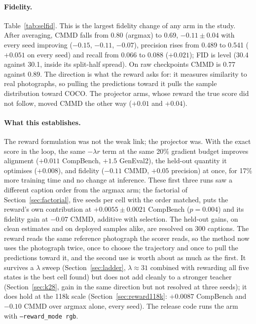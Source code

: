 \documentclass[11pt,a4paper]{article}
\begin{document}
\paragraph{Fidelity.}
Table~\ref{tab:selfid}. This is the largest fidelity change of any arm in the study. After averaging, CMMD falls from 0.80 (argmax) to 0.69, $-0.11\pm0.04$ with every seed improving ($-0.15$, $-0.11$, $-0.07$), precision rises from 0.489 to 0.541 ($+0.051$ on every seed) and recall from 0.066 to 0.088 ($+0.021$); FID is level (30.4 against 30.1, inside its split-half spread). On raw checkpoints CMMD is 0.77 against 0.89. The direction is what the reward asks for: it measures similarity to real photographs, so pulling the predictions toward it pulls the sample distribution toward COCO. The projector arms, whose reward the true score did not follow, moved CMMD the other way ($+0.01$ and $+0.04$).

\paragraph{What this establishes.}
The reward formulation was not the weak link; the projector was. With the exact score in the loop, the same $-\lambda r$ term at the same 20\% gradient budget improves alignment ($+0.011$ CompBench, $+1.5$ GenEval2), the held-out quantity it optimises ($+0.008$), and fidelity ($-0.11$ CMMD, $+0.05$ precision) at once, for 17\% more training time and no change at inference. These first three runs saw a different caption order from the argmax arm; the factorial of Section~\ref{sec:factorial}, five seeds per cell with the order matched, puts the reward's own contribution at $+0.0055\pm0.0021$ CompBench ($p=0.004$) and its fidelity gain at $-0.07$ CMMD, additive with selection. The held-out gains, on clean estimates and on deployed samples alike, are resolved on 300 captions. The reward reads the same reference photograph the scorer reads, so the method now uses the photograph twice, once to choose the trajectory and once to pull the predictions toward it, and the second use is worth about as much as the first. It survives a $\lambda$ sweep (Section~\ref{sec:ladder}, $\lambda\approx31$ combined with rewarding all five states is the best cell found) but does not add cleanly to a stronger teacher (Section~\ref{sec:k28}, gain in the same direction but not resolved at three seeds); it does hold at the 118k scale (Section~\ref{sec:reward118k}: $+0.0087$ CompBench and $-0.10$ CMMD over argmax alone, every seed). The release code runs the arm with \texttt{--reward\_mode rgb}.
\end{document}
